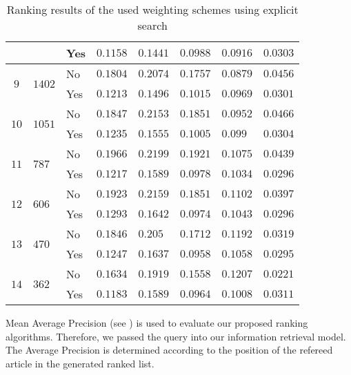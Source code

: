 \begin{table}[b]
\begin{adjustwidth}{-2cm}{}
\begin{tabular}{ c C{1.5cm} C{2.1cm} C{2.1cm} C{2.1cm} C{2.1cm} C{2.1cm} C{2.1cm} }
                                                    && Yes & $0.1158$ & $0.1441$ & $0.0988$ & $0.0916$ & $0.0303$  \\ \midrule
       &  & No  & $0.1804$ & $0.2074$ & $0.1757$ & $0.0879$ & $0.0456$  \\
                                                    && Yes & $0.1213$ & $0.1496$ & $0.1015$ & $0.0969$ & $0.0301$  \\ \midrule
       &  & No & $0.1847$ & $0.2153$ & $0.1851$ & $0.0952$ & $0.0466$  \\
                                                    && Yes & $0.1235$ & $0.1555$ & $0.1005$ & $0.099$  & $0.0304$  \\ \midrule
       &  & No  & $0.1966$ & $0.2199$ & $0.1921$ & $0.1075$ & $0.0439$  \\
                                                    && Yes & $0.1217$ & $0.1589$ & $0.0978$ & $0.1034$ & $0.0296$  \\ \midrule
       &  & No  & $0.1923$ & $0.2159$ & $0.1851$ & $0.1102$ & $0.0397$  \\
                                                    && Yes & $0.1293$ & $0.1642$ & $0.0974$ & $0.1043$ & $0.0296$  \\ \midrule
       &  & No  & $0.1846$ & $0.205$ & $0.1712$ & $0.1192$ & $0.0319$   \\
                                                    && Yes & $0.1247$ & $0.1637$ & $0.0958$ & $0.1058$ & $0.0295$  \\ \midrule
       &  & No  & $0.1634$ & $0.1919$ & $0.1558$ & $0.1207$ & $0.0221$  \\
                                                    && Yes & $0.1183$ & $0.1589$ & $0.0964$ & $0.1008$ & $0.0311$  \\
      \bottomrule
    \end{tabular}
  \caption[Ranking results with explicit search]{Ranking results of the used weighting schemes using explicit search}
  \label{tbl:ranking_result_explicit}
  \end{adjustwidth}
\end{table}

Mean Average Precision (see ) is used to evaluate our proposed ranking algorithms. Therefore, we passed the query into our information retrieval model. The Average Precision is determined according to the position of the refereed article in the generated ranked list.

